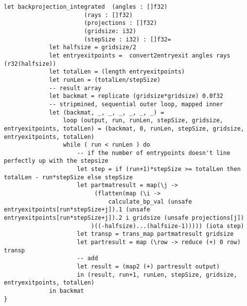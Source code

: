 \begin{lstlisting}[language=Futhark]
    let backprojection_integrated  (angles : []f32)
                       (rays : []f32)
                       (projections : []f32)
                       (gridsize: i32)
                       (stepSize : i32) : []f32=
             let halfsize = gridsize/2
             let entryexitpoints =  convert2entryexit angles rays (r32(halfsize))
             let totalLen = (length entryexitpoints)
             let runLen = (totalLen/stepSize)
             -- result array
             let backmat = replicate (gridsize*gridsize) 0.0f32
             -- stripmined, sequential outer loop, mapped inner
             let (backmat, _, _, _, _, _, _) =
                 loop (output, run, runLen, stepSize, gridsize, entryexitpoints, totalLen) = (backmat, 0, runLen, stepSize, gridsize, entryexitpoints, totalLen)
                 while ( run < runLen ) do
                     -- if the number of entrypoints doesn't line perfectly up with the stepsize
                     let step = if (run+1)*stepSize >= totalLen then totalLen - run*stepSize else stepSize
                     let partmatresult = map(\j ->
                          (flatten(map (\i ->
                              calculate_bp_val (unsafe entryexitpoints[run*stepSize+j]).1 (unsafe entryexitpoints[run*stepSize+j]).2 i gridsize (unsafe projections[j])
                         )((-halfsize)...(halfsize-1))))) (iota step)
                     let transp = trans_map partmatresult gridsize
                     let partresult = map (\row -> reduce (+) 0 row) transp
                     -- add
                     let result = (map2 (+) partresult output)
                     in (result, run+1, runLen, stepSize, gridsize, entryexitpoints, totalLen)
             in backmat
}

\end{lstlisting}
